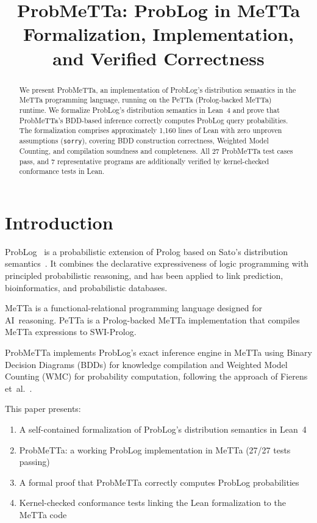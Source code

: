 \documentclass[11pt,a4paper]{article}
\title{ProbMeTTa: ProbLog in MeTTa\\[0.3em]
\large Formalization, Implementation, and Verified Correctness}
\author{}
\date{}
\theoremstyle{definition}
\begin{document}
\maketitle

\begin{abstract}
We present ProbMeTTa, an implementation of ProbLog's distribution semantics
in the MeTTa programming language, running on the PeTTa (Prolog-backed MeTTa)
runtime. We formalize ProbLog's distribution semantics in Lean~4 and prove
that ProbMeTTa's BDD-based inference correctly computes ProbLog query
probabilities. The formalization comprises approximately 1{,}160 lines of
Lean with zero unproven assumptions (\texttt{sorry}), covering BDD
construction correctness, Weighted Model Counting, and compilation
soundness and completeness. All 27 ProbMeTTa test cases pass, and 7
representative programs are additionally verified by kernel-checked
conformance tests in Lean.
\end{abstract}

\section{Introduction}

ProbLog~\cite{deraedt2007} is a probabilistic extension of Prolog based on
Sato's distribution semantics~\cite{sato1995}. It combines the declarative
expressiveness of logic programming with principled probabilistic reasoning,
and has been applied to link prediction, bioinformatics, and probabilistic
databases.

MeTTa is a functional-relational programming language designed for
AI~reasoning. PeTTa is a Prolog-backed MeTTa implementation that
compiles MeTTa expressions to SWI-Prolog.

ProbMeTTa implements ProbLog's exact inference engine in MeTTa using Binary
Decision Diagrams (BDDs) for knowledge compilation and Weighted Model
Counting (WMC) for probability computation, following the approach of
Fierens et~al.~\cite{fierens2015}.

This paper presents:
\begin{enumerate}
\item A self-contained formalization of ProbLog's distribution semantics in Lean~4
\item ProbMeTTa: a working ProbLog implementation in MeTTa (27/27 tests passing)
\item A formal proof that ProbMeTTa correctly computes ProbLog probabilities
\item Kernel-checked conformance tests linking the Lean formalization to the MeTTa code
\end{enumerate}
\end{document}
